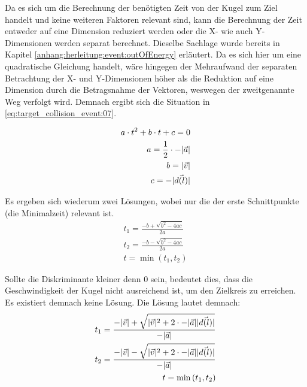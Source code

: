 Da es sich um die Berechnung der benötigten Zeit von der Kugel zum Ziel handelt und keine weiteren Faktoren relevant sind,
kann die Berechnung der Zeit entweder auf eine Dimension reduziert werden oder die X- wie auch Y-Dimensionen werden separat
berechnet. Dieselbe Sachlage wurde bereits in Kapitel \ref{anhang:herleitung:event:outOfEnergy} erläutert. Da es sich
hier um eine quadratische Gleichung handelt, wäre hingegen der Mehraufwand der separaten Betrachtung der X- und Y-Dimensionen
höher als die Reduktion auf eine Dimension durch die Betragsnahme der Vektoren, weswegen der zweitgenannte Weg verfolgt
wird. Demnach ergibt sich die Situation in \ref{eq:target_collision_event:07}.

\begin{align}
    a \cdot t^2 + b \cdot t + c = 0\\\label{eq:target_collision_event:07}
    a = \frac{1}{2} \cdot -\lvert \vec{a} \rvert\\
    b = \lvert \vec{v} \rvert\\
    c = -\lvert \vec{d(l)} \rvert
\end{align}

Es ergeben sich wiederum zwei Lösungen, wobei nur die der erste Schnittpunkte (die Minimalzeit) relevant ist.
\begin{align}
    t_1 = \frac{-b + \sqrt{b^2 - 4ac}}{2a}\\
    t_2 = \frac{-b - \sqrt{b^2 - 4ac}}{2a}\\
    t = \min{(t_1, t_2)}
\end{align}

Sollte die Diskriminante kleiner denn $0$ sein, bedeutet dies, dass die Geschwindigkeit der Kugel nicht ausreichend
ist, um den Zielkreis zu erreichen. Es existiert demnach keine Lösung. Die Lösung lautet demnach:
\begin{align}
    t_1 = \frac{-\lvert \vec{v} \rvert + \sqrt{\lvert \vec{v} \rvert^2 + 2 \cdot -\lvert \vec{a} \rvert \lvert \vec{d(l)} \rvert}}{-\lvert \vec{a} \rvert}\\
    t_2 = \frac{-\lvert \vec{v} \rvert - \sqrt{\lvert \vec{v} \rvert^2 + 2 \cdot -\lvert \vec{a} \rvert \lvert \vec{d(l)} \rvert}}{-\lvert \vec{a} \rvert}\\
    t = \min{(t_1, t_2)}
\end{align}